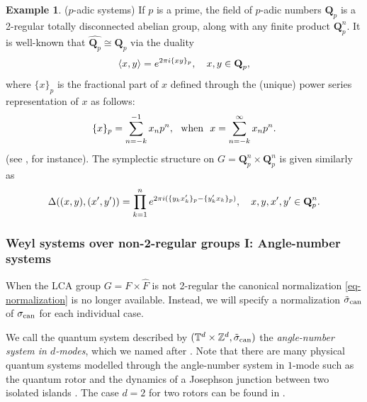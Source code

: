 \documentclass[12pt,reqno]{amsart}
\theoremstyle{definition}
\newtheorem{ex}[thm]{Example}
\theoremstyle{definition}
\theoremstyle{definition}
\numberwithin{thm}{section}
\numberwithin{equation}{section}
\newcommand{\la}{\langle}
\newcommand{\ra}{\rangle}
\newcommand{\tor}{\mathbb{T}}
\newcommand{\z}{\mathbb{Z}}
\newcommand{\tcr}[1]{\textcolor{red}{#1}}
\begin{document}
\begin{ex}\label{ex:p-adic} ($p$-adic systems) If $p$ is a prime, the field of $p$-adic numbers $\textbf{Q}_p$ is a 2-regular totally disconnected abelian group, along with any finite product $\textbf{Q}_p^n$. It is well-known that $\widehat{\textbf{Q}_p}\cong\textbf{Q}_p$ via the duality
\begin{equation}
 \notag    \la x,y\ra=e^{2\pi i\{xy\}_p}, \ \ \ x,y\in\textbf{Q}_p,
\end{equation}
where $\{x\}_p$ is the fractional part of $x$ defined through the (unique) power series representation of $x$ as follows:
\begin{equation}
\notag \{x\}_p=\sum_{n=-k}^{-1}x_n p^n, \ \ \textnormal{when} \ \ x=\sum_{n=-k}^\infty x_np^n.    
\end{equation}
(see \cite[Theorem 4.12]{Folland-book}, for instance). The symplectic structure on $G=\textbf{Q}_p^n\times\textbf{Q}_p^n$ is given similarly as 
\begin{equation}
\notag \Delta((x,y),(x',y'))=\prod_{k=1}^ne^{2\pi i(\{y_kx_k'\}_p-\{y_k'x_k\}_p)}, \ \ \ x,y,x',y'\in \textbf{Q}_p^n.    
\end{equation}
\end{ex}


\subsubsection{Weyl systems over non-2-regular groups I: Angle-number systems}\label{ss:ANS}
When the LCA group $G=F\times\widehat{F}$ is not 2-regular the canonical normalization \eqref{eq-normalization} is no longer available. Instead, we will specify a normalization $\tilde{\sigma}_{\rm can}$ of $\sigma_{\rm can}$ for each individual case.


We call the quantum system described by $(\tor^d \times \z^d, \tilde{\sigma}_{\rm can})$ the {\em angle-number system in $d$-modes}, which we named after \cite[Table I]{Wer16}. Note that there are many physical quantum systems modelled through the angle-number system in $1$-mode such as the quantum rotor \cite{RKSE} and the dynamics of a Josephson junction between two isolated islands \cite{G}. The case $d=2$ for two rotors can be found in \cite[Sec IV. B.]{ACP}.
\end{document}
